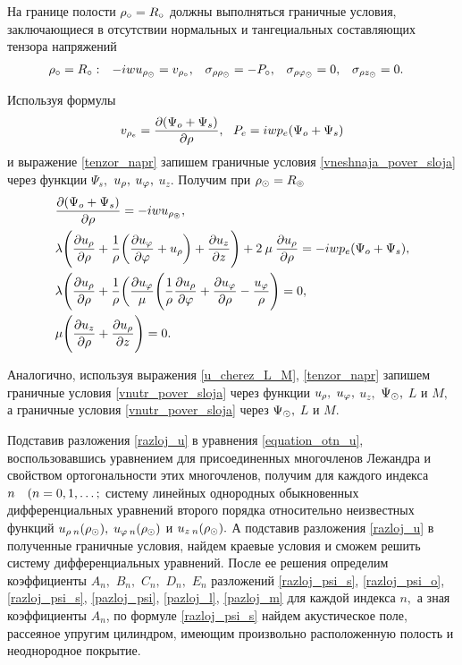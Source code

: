 На границе полости $\rho_\circ=R_\circ$ должны выполняться граничные условия, заключающиеся в отсутствии нормальных и тангециальных составляющих тензора напряжений
\begin{equation}\label{gran_pol}
\begin{aligned}
\rho_\circ &=R_\circ: &-iwu_{\rho_\odot}&=v_{\rho_\circ}, &\sigma_{\rho\rho_\odot}&=-P_\circ, &\sigma_{\rho\varphi_\odot}&=0, &\sigma_{\rho z_\odot}&=0.
\end{aligned}
\end{equation}

Используя формулы
$$v_{\rho_e}=\frac{\partial(\Psi_{o}+\Psi_s)}{\partial\rho},\:\:\: P_e=iwp_e(\Psi_{o}+\Psi_s)$$
и выражение \eqref{tenzor_napr} запишем граничные условия \eqref{vneshnaja_pover_sloja} через функции $\Psi_s,$ $u_\rho,$ $u_\varphi,$ $u_z$. Получим при $\rho_\odot=R_\circledcirc$
\begin{align}
&\frac{\partial(\Psi_{o}+\Psi_s)}{\partial\rho}=-iwu_{\rho_\circledcirc},\\
&\lambda\Biggl(\frac{\partial u_{\rho}}{\partial \rho}+\frac{1}{\rho}\biggl(\frac{\partial u_\varphi}{\partial\varphi}+u_{\rho}\biggr)+\frac{\partial u_z}{\partial z}\Biggr)+2\:\mu\:\frac{\partial u_{\rho}}{\partial \rho}=-iwp_e(\Psi_{o}+\Psi_s),\\
&\lambda\Biggl(\frac{\partial u_{\rho}}{\partial \rho}+\frac{1}{\rho}\biggl(\frac{\partial u_\varphi}\mu\Biggl(\frac{1}{\rho}\frac{\partial u_{\rho}}{\partial\varphi}+\frac{\partial u_\varphi}{\partial \rho}-\frac{u_{\varphi}}{\rho}\Biggr)=0,\\
&\mu\Biggl(\frac{\partial u_z}{\partial \rho}+\frac{\partial u_{\rho}}{\partial z}\Biggr)=0.
\end{align}

Аналогично, используя выражения \eqref{u_cherez_L_M}, \eqref{tenzor_napr} запишем граничные условия \eqref{vnutr_pover_sloja} через функции $u_\rho,$ $u_\varphi,$ $u_z,$ $ \Psi_\odot,$ $L$ и $M ,$ а граничные условия \eqref{vnutr_pover_sloja} через $\Psi_\odot,$ $L$ и $M.$

Подставив разложения \eqref{razloj_u} в уравнения \eqref{equation_otn_u}, воспользовавшись уравнением для присоединенных многочленов Лежандра и свойством ортогональности этих многочленов, получим для каждого индекса $n \quad(n = 0,1,\ldots;$ систему линейных однородных обыкновенных дифференциальных уравнений второго порядка относительно неизвестных функций $u_{\rho\:n}(\rho_\odot),$ $u_{\varphi\:n}(\rho_\odot)$ и $u_{z\:n}(\rho_\odot).$ А подставив разложения \eqref{razloj_u} в полученные граничные условия, найдем краевые условия и сможем решить  систему дифференциальных уравнений. После ее решения определим коэффициенты $A_n,$ $B_n,$ $C_n,$ $D_n,$ $E_n$ разложений  \eqref{razloj_psi_s}, \eqref{razloj_psi_o}, \eqref{razloj_psi_s}, \eqref{pazloj_psi}, \eqref{pazloj_l}, \eqref{pazloj_m} для каждой индекса $n,$ а зная коэффициенты ${A}_{n}$, по формуле \eqref{razloj_psi_s} найдем акустическое поле, рассеяное упругим цилиндром, имеющим произвольно расположенную полость и неоднородное покрытие.
\newpage
